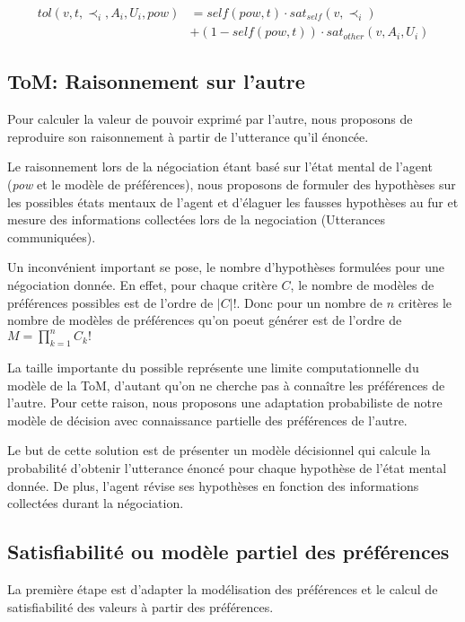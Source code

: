 \documentclass{llncs}
\begin{document}
	\begin{equation}
	\begin{split}
	tol(v, t, \prec_i, A_i, U_i, pow) & = self(pow, t)  \cdot sat_{self}(v, \prec_i) \\
	& +  (1 - self(pow, t)) \cdot sat_{other}(v, A_i, U_i)
	\end{split} 
	\end{equation}
	
	
	\subsection{ToM: Raisonnement sur l'autre}
	
	
	Pour calculer la valeur de pouvoir exprimé par l'autre, nous proposons de reproduire son raisonnement à partir de l'utterance qu'il énoncée.
	
	Le raisonnement lors de la négociation étant basé  sur l'état mental de l'agent (\textit{pow} et le modèle de préférences), nous proposons de formuler des hypothèses sur les possibles états mentaux de l'agent et d'élaguer les fausses hypothèses au fur et mesure des informations collectées lors de la negociation (Utterances communiquées).
	
	Un inconvénient important se pose, le nombre d'hypothèses formulées pour une négociation donnée. En effet, pour chaque critère $C$, le nombre de modèles de préférences possibles est de l'ordre de $|C| !$. Donc pour un nombre de $n$ critères le nombre de modèles de préférences qu'on poeut générer est de l'ordre de $ M = \prod_{k=1}^n C_k!$
	
	La taille importante du possible représente une limite computationnelle du modèle de la ToM, d'autant qu'on ne cherche pas à connaître les préférences de l'autre. Pour cette raison, nous proposons une adaptation probabiliste de notre modèle de décision avec connaissance partielle des préférences de l'autre. 
	
	Le but de cette solution est de présenter un modèle décisionnel qui calcule la probabilité d'obtenir l'utterance énoncé pour chaque hypothèse de l’état mental donnée. De plus, l'agent révise ses hypothèses en fonction des informations collectées durant la négociation.
	
	
	\subsection{Satisfiabilité ou modèle partiel des préférences}
	La première étape est d'adapter la modélisation des préférences et le calcul de satisfiabilité des valeurs à partir des préférences.
	
\end{document}
